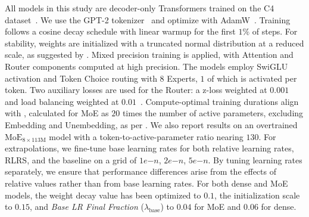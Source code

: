 \documentclass{article}
\theoremstyle{plain}
\theoremstyle{definition}
\theoremstyle{remark}
\newcommand{\moe}[1]{$\text{MoE}_{8\times#1\text{M}}$}
\newcommand{\jl}[1]{\textcolor{green}{[JL: #1]}}
\newcommand{\jmr}[2]{\textcolor{purple}{[JM:] \sout{#1} #2}}
\begin{document}
    All models in this study are decoder-only Transformers trained on the C4 dataset~\citep{raffel2023exploring}. We use the GPT-2 tokenizer~\citep{radford2018improving} and optimize with AdamW~\citep{loshchilov2019decoupled}. Training follows a cosine decay schedule with linear warmup for the first $1\%$ of steps. For stability, weights are initialized with a truncated normal distribution at a reduced scale, as suggested by \citet{fedus2022switch}. Mixed precision training is applied, with Attention and Router components computed at high precision. The models employ SwiGLU activation and Token Choice routing with $8$ Experts, $1$ of which is activated per token. Two auxiliary losses are used for the Router: a z-loss weighted at $0.001$~\citep{zoph2022st} and load balancing weighted at $0.01$~\citep{fedus2022switch}. Compute-optimal training durations align with \citet{hoffmann2022training}, calculated for MoE as $20$ times the number of active parameters, excluding Embedding and Unembedding, as per \citet{ludziejewskiscaling}. We also report results on an overtrained \moe{113} model with a token-to-active-parameter ratio nearing $130$. For extrapolations, we fine-tune base learning rates for both relative learning rates, RLRS, and the baseline on a grid of {$1e{-n}$, $2e{-n}$, $5e{-n}$}. By tuning learning rates separately, we ensure that performance differences arise from the effects of relative values rather than from base learning rates.
    For both dense and MoE models, the weight decay value has been optimized to $0.1$, the initialization scale to $0.15$, and \textit{Base LR Final Fraction} ($\lambda_{\text{base}}$) to $0.04$ for MoE and $0.06$ for dense. 
    
\end{document}
